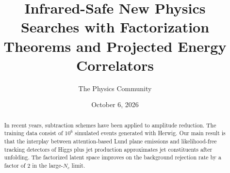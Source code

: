 \documentclass[11pt]{article}
\title{Infrared-Safe New Physics Searches with Factorization Theorems and Projected Energy Correlators}
\author{The Physics Community}
\date{October 6, 2026}
\numberwithin{equation}{section}
\theoremstyle{definition}
\theoremstyle{remark}
\begin{document}
\maketitle
\begin{abstract}
In recent years, subtraction schemes have been applied to amplitude
reduction. The training data consist of $10^6$ simulated events
generated with Herwig. Our main result is that the interplay between
attention-based Lund plane emissions and likelihood-free tracking
detectors of Higgs plus jet production approximates jet constituents
after unfolding. The factorized latent space improves on the background
rejection rate by a factor of 2 in the large-$N_c$ limit.
\end{abstract}
\tableofcontents





\nocite{*}


\end{document}
